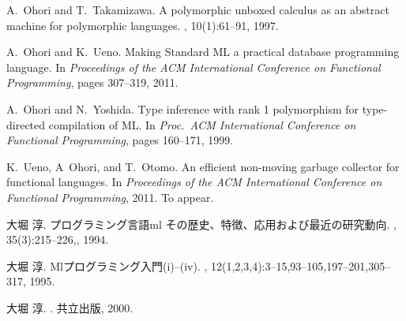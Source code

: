 \documentclass{jbook}
\begin{document}
\begin{thebibliography}{10}
A.~Ohori and T.~Takamizawa.
\newblock A polymorphic unboxed calculus as an abstract machine for polymorphic
  languages.
, 10(1):61--91, 1997.

A.~Ohori and K.~Ueno.
\newblock Making {Standard ML} a practical database programming language.
\newblock In {\em Proceedings of the ACM International Conference on Functional
  Programming}, pages 307--319, 2011.

A.~Ohori and N.~Yoshida.
\newblock Type inference with rank 1 polymorphism for type-directed compilation
  of {ML}.
\newblock In {\em Proc.\ ACM International Conference on Functional
  Programming}, pages 160--171, 1999.

K.~Ueno, A~Ohori, and T.~Otomo.
\newblock An efficient non-moving garbage collector for functional languages.
\newblock In {\em Proceedings of the ACM International Conference on Functional
  Programming}, 2011.
\newblock To appear.

大堀 淳.
\newblock プログラミング言語ml その歴史、特徴、応用および最近の研究動向.
, 35(3):215--226,, 1994.

大堀 淳.
\newblock Mlプログラミング入門(i)--(iv).
,
  12(1,2,3,4):3--15,93--105,197--201,305--317, 1995.

大堀 淳.
.
\newblock 共立出版, 2000.

\end{thebibliography}
\end{document}
